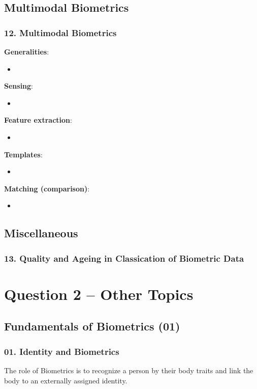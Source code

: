 \documentclass[a4paper]{article}
\begin{document}
  \subsection*{Multimodal Biometrics}
    \subsubsection*{12. Multimodal Biometrics}
      \textbf{Generalities}:
      \begin{itemize}
        \item 
      \end{itemize}

      \textbf{Sensing}:
      \begin{itemize}
        \item 
      \end{itemize}

      \textbf{Feature extraction}:
      \begin{itemize}
        \item 
      \end{itemize}

      \textbf{Templates}:
      \begin{itemize}
        \item 
      \end{itemize}

      \textbf{Matching (comparison)}:
      \begin{itemize}
        \item 
      \end{itemize}
  \subsection*{Miscellaneous}
    \subsubsection*{13. Quality and Ageing in Classication of Biometric Data}

\newpage

\section*{Question 2 -- Other Topics} %
\label{sec:question_2_other_topics}
  \subsection*{Fundamentals of Biometrics (01)}
    \subsubsection*{01. Identity and Biometrics}
      The role of Biometrics is to recognize a person by their body traits and link the body to an externally assigned identity.
\end{document}
